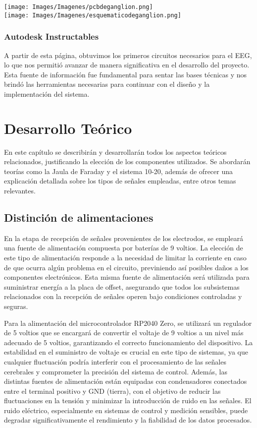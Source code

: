 \documentclass{article}
\begin{document}
\begin{center}
    \texttt{[image: Images/Imagenes/pcbdeganglion.png]}\\

    \texttt{[image: Images/Imagenes/esquematicodeganglion.png]}\\
\end {center}

\subsubsection{Autodesk Instructables}
A partir de esta página, obtuvimos los primeros circuitos necesarios para el EEG, lo que nos permitió avanzar de manera significativa en el desarrollo del proyecto. Esta fuente de información fue fundamental para sentar las bases técnicas y nos brindó las herramientas necesarias para continuar con el diseño y la implementación del sistema.

\section{Desarrollo Teórico}
En este capítulo se describirán y desarrollarán todos los aspectos teóricos relacionados, justificando la elección de los componentes utilizados. Se abordarán teorías como la Jaula de Faraday y el sistema 10-20, además de ofrecer una explicación detallada sobre los tipos de señales empleadas, entre otros temas relevantes.

\subsection{Distinción de alimentaciones}

En la etapa de recepción de señales provenientes de los electrodos, se empleará una fuente de alimentación compuesta por baterías de 9 voltios. La elección de este tipo de alimentación responde a la necesidad de limitar la corriente en caso de que ocurra algún problema en el circuito, previniendo así posibles daños a los componentes electrónicos. Esta misma fuente de alimentación será utilizada para suministrar energía a la placa de offset, asegurando que todos los subsistemas relacionados con la recepción de señales operen bajo condiciones controladas y seguras.

Para la alimentación del microcontrolador RP2040 Zero, se utilizará un regulador de 5 voltios que se encargará de convertir el voltaje de 9 voltios a un nivel más adecuado de 5 voltios, garantizando el correcto funcionamiento del dispositivo. La estabilidad en el suministro de voltaje es crucial en este tipo de sistemas, ya que cualquier fluctuación podría interferir con el procesamiento de las señales cerebrales y comprometer la precisión del sistema de control. Además, las distintas fuentes de alimentación están equipadas con condensadores conectados entre el terminal positivo y GND (tierra), con el objetivo de reducir las fluctuaciones en la tensión y minimizar la introducción de ruido en las señales. El ruido eléctrico, especialmente en sistemas de control y medición sensibles, puede degradar significativamente el rendimiento y la fiabilidad de los datos procesados.
\end{document}
